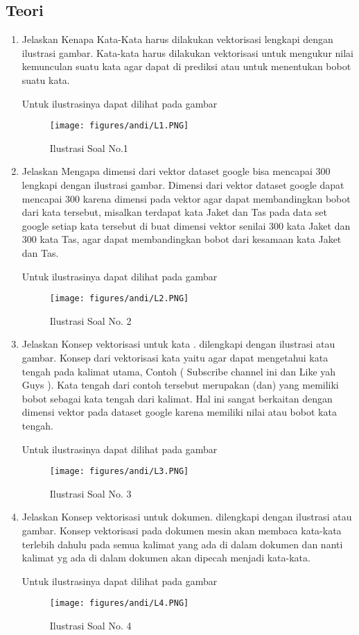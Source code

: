 \subsection{Teori}
\begin{enumerate}
\item Jelaskan Kenapa Kata-Kata harus dilakukan vektorisasi lengkapi dengan ilustrasi gambar.
\subitem Kata-kata harus dilakukan vektorisasi untuk mengukur nilai kemunculan suatu kata agar dapat di prediksi atau untuk menentukan bobot suatu kata.
\par Untuk ilustrasinya dapat dilihat pada gambar
\begin{figure}[ht]
	\centerline{\texttt{[image: figures/andi/L1.PNG]}}
	\caption{Ilustrasi Soal No.1}
\end{figure}

\item Jelaskan Mengapa dimensi dari vektor dataset google bisa mencapai 300 lengkapi dengan ilustrasi gambar.
\subitem Dimensi dari vektor dataset google dapat mencapai 300 karena dimensi pada vektor agar dapat membandingkan bobot dari kata tersebut, misalkan terdapat kata Jaket dan Tas pada data set google setiap kata tersebut di buat dimensi vektor senilai 300 kata Jaket dan 300 kata Tas, agar dapat membandingkan bobot dari kesamaan kata Jaket dan Tas. 
\par Untuk ilustrasinya dapat dilihat pada gambar 
\begin{figure}[ht]
	\centerline{\texttt{[image: figures/andi/L2.PNG]}}
	\caption{Ilustrasi Soal No. 2}
	
\end{figure}

\item Jelaskan Konsep vektorisasi untuk kata . dilengkapi dengan ilustrasi atau gambar.
\subitem Konsep dari vektorisasi kata yaitu agar dapat mengetahui kata tengah pada kalimat utama, Contoh ( Subscribe channel ini dan Like yah Guys ). Kata tengah dari contoh tersebut merupakan (dan) yang memiliki bobot sebagai kata tengah dari kalimat. Hal ini sangat berkaitan dengan dimensi vektor pada dataset google karena memiliki nilai atau bobot kata tengah.
\par Untuk ilustrasinya dapat dilihat pada gambar \begin{figure}[ht]
	\centerline{\texttt{[image: figures/andi/L3.PNG]}}
	\caption{Ilustrasi Soal No. 3}
	
\end{figure}
\item Jelaskan Konsep vektorisasi untuk dokumen. dilengkapi dengan ilustrasi atau gambar.
\subitem Konsep vektorisasi pada dokumen mesin akan membaca kata-kata terlebih dahulu pada semua kalimat yang ada di dalam dokumen dan nanti kalimat yg ada di dalam dokumen akan dipecah menjadi kata-kata.
\par Untuk ilustrasinya dapat dilihat pada gambar 
\begin{figure}[ht]
	\centerline{\texttt{[image: figures/andi/L4.PNG]}}
	\caption{Ilustrasi Soal No. 4}
	

\end{figure}
\end{enumerate}
